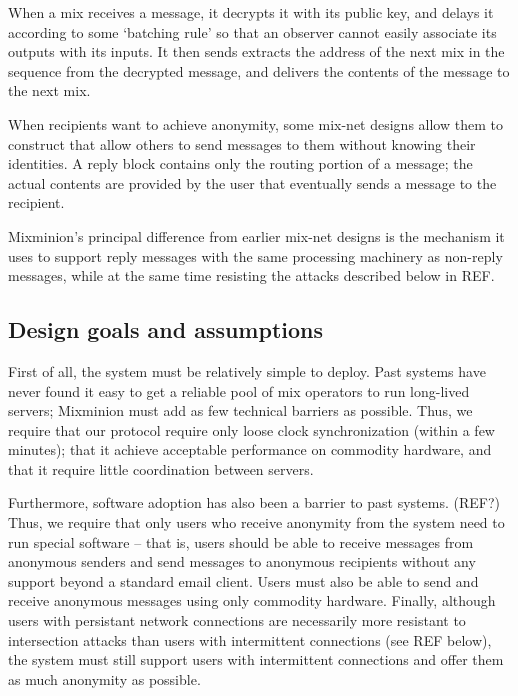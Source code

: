 \documentclass[11pt]{IEEEtran}
\begin{document}
When a mix receives a message, it decrypts it with its public key, 
and delays it according to some `batching rule' so that an observer
cannot easily associate its outputs with its inputs.  It then sends
extracts the address of the next mix in the sequence from the
decrypted message, and delivers the contents of the message to the
next mix.


When recipients want to achieve anonymity, some mix-net designs allow
them to construct  that allow others to send
messages to them without knowing their identities.  A reply block
contains only the routing portion of a message; the actual contents
are provided by the user that eventually sends a message to the
recipient.

Mixminion's principal difference from earlier mix-net designs is the
mechanism it uses to support reply messages with the same processing
machinery as non-reply messages, while at the same time resisting the
attacks described below in REF.

\subsection{Design goals and assumptions}

First of all, the system must be relatively simple to deploy.  Past
systems have never found it easy to get a reliable pool of mix
operators to run long-lived servers; Mixminion must add as few
technical barriers as possible.  Thus, we require that our protocol
require only loose clock synchronization (within a few minutes);
that it achieve acceptable performance on commodity hardware, and 
that it require little coordination between servers.

Furthermore, software adoption has also been a barrier to past
systems. (REF?) Thus, we require that only users who receive anonymity
from the system need to run special software -- that is, users should
be able to receive messages from anonymous senders and send messages
to anonymous recipients without any support beyond a standard email
client.  Users must also be able to send and receive anonymous
messages using only commodity hardware.  Finally, although users with
persistant network connections are necessarily more resistant to
intersection attacks than users with intermittent connections (see
REF below), the system must still support users with intermittent
connections and offer them as much anonymity as possible.
\end{document}
